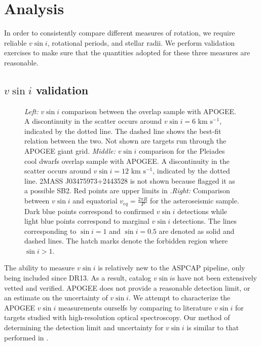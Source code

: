 \documentclass[manuscript]{aastex6}
\newcommand{\vsini}{\ensuremath{v \sin i}}
\newcommand{\kms}{\textrm{~km~s}\ensuremath{^{-1}}}
\begin{document}
\section{Analysis}
\label{sec:analysis}

In order to consistently compare different measures of rotation, we require 
reliable \vsini{}, rotational periods, and stellar radii. We perform validation
exercises to make sure that the quantities adopted for these three measures are 
reasonable.


\subsection{\vsini{} validation}
\label{sec:vsini_check}

\begin{figure*}
    \caption{\emph{Left:} \vsini{} comparison between the \citet{Bruntt12}
        overlap sample with APOGEE\@. A discontinuity in the scatter occurs
        around \(\vsini = 6 \kms\), indicated by the dotted line. The dashed
    line shows the best-fit relation between the two. Not shown are targets 
    run through the APOGEE giant grid. \emph{Middle:} \vsini{} comparison for 
    the Pleiades cool dwarfs \citep{Stauffer87} overlap sample with APOGEE\@. 
    A discontinuity in the scatter occurs around \(\vsini = 12 \kms\), 
    indicated by the dotted line. 2MASS J03475973+2443528 is not shown
    because \citet{Stauffer87} flagged it as a possible SB2. Red points are 
    upper limits in \citet{Stauffer87}.\emph{Right:} Comparison between
    \vsini{} and equatorial \(v_{eq} = \frac{2\pi R}{P}\) for the 
    asteroseismic sample. Dark blue points correspond to confirmed
    \vsini{} detections while light blue points correspond to marginal
    \vsini{} detections. The lines corresponding to \(\sin i = 1\) and
    \(\sin i = 0.5\) are denoted as solid and dashed lines. The hatch
    marks denote the forbidden region where \(\sin i > 1\).\label{fig:comps}}
\end{figure*}


The ability to measure \vsini{} is relatively new to the ASPCAP pipeline, only
being included since DR13. As a result, catalog \vsini{}s have not been 
extensively vetted and verified. APOGEE does not provide a reasonable
detection limit, or an estimate on the uncertainty of \vsini{}. We
attempt to characterize the APOGEE \vsini{} measurements ourselfs
by comparing to literature \vsini{} for targets studied with high-resolution 
optical spectroscopy. Our method of determining the detection limit and
uncertainty for \vsini{} is similar to that performed in
\citet{Tayar15}.
\end{document}
